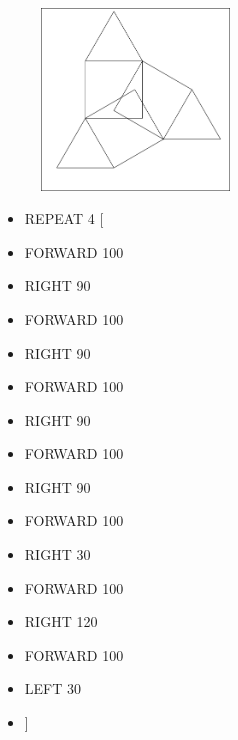\begin{minipage}{0.5\textwidth}
\begin{figure}[H]
   \includegraphics[width=5.0cm,trim=4 4 6 4,clip]{./images/marta/mar-10.png}
   \label{mar-12}
\end{figure}
\end{minipage} \hfill
\begin{minipage}{0.45\textwidth}
\begin{itemize}[itemsep=-3pt,parsep=2pt]
\item[] \hspace{0.5cm} REPEAT 4 [
\item[] \hspace{0.5cm} 	FORWARD 100
\item[] \hspace{0.5cm} 	RIGHT 90
\item[] \hspace{0.5cm} 	FORWARD 100
\item[] \hspace{0.5cm} 	RIGHT 90
\item[] \hspace{0.5cm} 	FORWARD 100
\item[] \hspace{0.5cm} 	RIGHT 90
\item[] \hspace{0.5cm} 	FORWARD 100
\item[] \hspace{0.5cm} 	RIGHT 90
\item[] \hspace{0.5cm} 	FORWARD 100
\item[] \hspace{0.5cm} 	RIGHT 30
\item[] \hspace{0.5cm} 	FORWARD 100
\item[] \hspace{0.5cm} 	RIGHT 120
\item[] \hspace{0.5cm} 	FORWARD 100
\item[] \hspace{0.5cm} 	LEFT 30
\item[] \hspace{0.5cm} 	]          
\end{itemize}          	          
\end{minipage}

